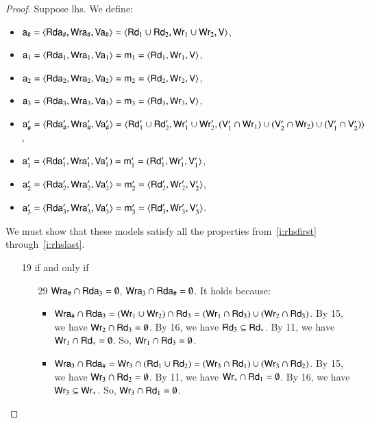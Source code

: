 \begin{proof}
Suppose lhs. We define:
\begin{itemize} 
\item $\mathsf a_\# = \langle \mathsf {Rda}_\#, \mathsf {Wra}_\#, \mathsf {Va}_\# \rangle = \langle \mathsf{Rd}_1 \cup \mathsf{Rd}_2, \mathsf{Wr}_1 \cup \mathsf{Wr}_2, \mathsf{V} \rangle$,
\item $\mathsf a_1 = \langle \mathsf {Rda}_1, \mathsf {Wra}_1, \mathsf {Va}_1 \rangle = \mathsf m_1 = \langle \mathsf{Rd}_1, \mathsf{Wr}_1, \mathsf{V} \rangle$,
\item $\mathsf a_2 = \langle \mathsf {Rda}_2, \mathsf {Wra}_2, \mathsf {Va}_2 \rangle = \mathsf m_2 = \langle \mathsf{Rd}_2, \mathsf{Wr}_2, \mathsf{V} \rangle$,
\item $\mathsf a_3 = \langle \mathsf {Rda}_3, \mathsf {Wra}_3, \mathsf {Va}_3 \rangle = \mathsf m_3 = \langle \mathsf{Rd}_3, \mathsf{Wr}_3, \mathsf{V} \rangle$,
\item $\mathsf a'_\# = \langle \mathsf {Rda}'_\#, \mathsf {Wra}'_\#, \mathsf {Va}'_\# \rangle = \langle \mathsf{Rd}'_1 \cup \mathsf{Rd}'_2, \mathsf{Wr}'_1 \cup \mathsf{Wr}'_2, (\mathsf{V}'_1 \cap \mathsf{Wr}_1) \cup (\mathsf{V}'_2 \cap \mathsf{Wr}_2) \cup (\mathsf{V}'_1 \cap \mathsf{V}'_2) \rangle$,
\item $\mathsf a'_1 = \langle \mathsf {Rda}'_1, \mathsf {Wra}'_1, \mathsf {Va}'_1) = \mathsf m'_1 = (\mathsf{Rd}'_1, \mathsf{Wr}'_1, \mathsf{V}'_1 \rangle$,
\item $\mathsf a'_2 = \langle \mathsf {Rda}'_2, \mathsf {Wra}'_2, \mathsf {Va}'_2 \rangle = \mathsf m'_2 = \langle \mathsf{Rd}'_2, \mathsf{Wr}'_2, \mathsf{V}'_2 \rangle$,
\item $\mathsf a'_3 = \langle \mathsf {Rda}'_3, \mathsf {Wra}'_3, \mathsf {Va}'_3 \rangle = \mathsf m'_3 = \langle \mathsf{Rd}'_3, \mathsf{Wr}'_3, \mathsf{V}'_3 \rangle$. 
\end{itemize}

We must show that these models satisfy all the properties from~\ref{i:rhsfirst} through~\ref{i:rhslast}.
\begin{itemize}
\item[19] if and only if
  \begin{itemize}
  \item[29]  $\mathsf {Wra}_\# \cap \mathsf {Rda}_3 = \emptyset$,
    $\mathsf {Wra}_3 \cap \mathsf {Rda}_\# = \emptyset$. It holds because:
    \begin{itemize}
    \item $\mathsf {Wra}_\# \cap \mathsf {Rda}_3 = (\mathsf{Wr}_1 \cup \mathsf{Wr}_2) \cap \mathsf{Rd}_3 = (\mathsf{Wr}_1 \cap \mathsf{Rd}_3) \cup (\mathsf{Wr}_2 \cap \mathsf{Rd}_3)$.
      By 15, we have $\mathsf{Wr}_2 \cap \mathsf{Rd}_3 = \emptyset$.
      By 16, we have $\mathsf{Rd}_3 \subseteq \mathsf{Rd}_*$.
      By 11, we have $\mathsf{Wr}_1 \cap \mathsf{Rd}_* = \emptyset$. So, $\mathsf{Wr}_1 \cap \mathsf{Rd}_3 = \emptyset$.
    \item $\mathsf {Wra}_3 \cap \mathsf {Rda}_\# = \mathsf{Wr}_3 \cap (\mathsf{Rd}_1 \cup \mathsf{Rd}_2) = (\mathsf{Wr}_3 \cap \mathsf{Rd}_1) \cup (\mathsf{Wr}_3 \cap \mathsf{Rd}_2)$.
      By 15, we have $\mathsf{Wr}_3 \cap \mathsf{Rd}_2 = \emptyset$.
      By 11, we have $\mathsf{Wr}_* \cap \mathsf{Rd}_1 = \emptyset$.
      By 16, we have $\mathsf{Wr}_3 \subseteq \mathsf{Wr}_*$.
      So, $\mathsf{Wr}_3 \cap \mathsf{Rd}_1 = \emptyset$.
    \end{itemize}
  

\end{itemize}
\end{itemize}
\end{proof}
